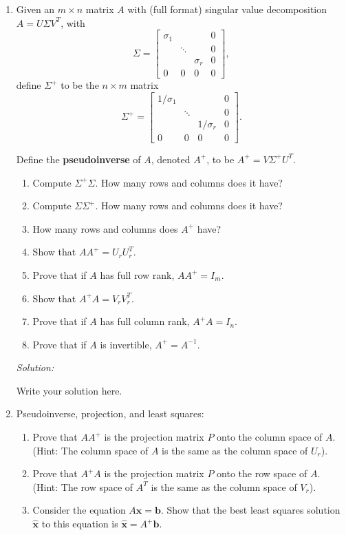 \documentclass[11pt]{article}
\renewcommand{\vec}[1]{\ensuremath{\mathbf{#1}}}
\newenvironment{sol}
    {\emph{Solution:}
    }
\newcommand{\headings}{
\large{\textbf{YOUR NAME GOES HERE \hfill 21-241 Fall 2019}\\
\textbf{Homework 11 \hfill Due Tuesday, November 26}}\\
\rule[0.1in]{\textwidth}{0.01in}
}
\begin{document}
\headings


\begin{enumerate}
\section*{Required Problems}


\item Given an $m \times n$  matrix $A$ with (full format) singular value decomposition $A = U \Sigma V^T$, with 
\[\Sigma = \begin{bmatrix} \sigma_1 & & & 0 \\ & \ddots & & 0 \\ & & \sigma_r & 0 \\ 0 & 0 & 0 & 0 \end{bmatrix},\] define $\Sigma^+$ to be the $n \times m$ matrix
\[\Sigma^+ = \begin{bmatrix} 1/\sigma_1 & & & 0 \\ & \ddots & & 0 \\ & & 1/\sigma_r & 0 \\ 0 & 0 & 0 & 0 \end{bmatrix}.\] 


Define the \textbf{pseudoinverse} of $A$, denoted $A^+$, to be $A^+ = V\Sigma^+ U^T$.


\begin{enumerate}
\item Compute $\Sigma^+ \Sigma$. How many rows and columns does it have?
\item Compute $\Sigma \Sigma^+$. How many rows and columns does it have?
\item How many rows and columns does $A^+$ have?
\item Show that $AA^+ = U_rU_r^T$.
\item Prove that if $A$ has full row rank, $AA^+ = I_m$.
\item Show that $A^+A = V_rV_r^T$.
\item Prove that if $A$ has full column rank, $A^+A = I_n$.
\item Prove that if $A$ is invertible, $A^+ = A^{-1}$.
\end{enumerate}


 \begin{sol}
Write your solution here.
\end{sol}
\clearpage

\item Pseudoinverse, projection, and least squares:
\begin{enumerate}
\item Prove that $AA^+$ is the projection matrix $P$ onto the column space of $A$. (Hint: The column space of $A$ is the same as the column space of $U_r$).
\item Prove that $A^+A$ is the projection matrix $P$ onto the row space of $A$. (Hint: The row space of $A^T$ is the same as the column space of $V_r$).
\item Consider the equation $A\vec{x} = \vec{b}$. Show that the best least squares solution $\hat{\vec{x}}$ to this equation is $\hat{\vec{x}} = A^+\vec{b}$.
\end{enumerate}


\end{enumerate}
\end{document}
